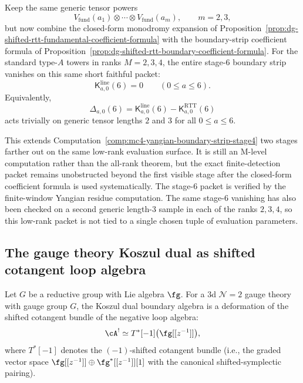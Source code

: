 \begin{computation}
\label{comp:mc4-yangian-boundary-strip-stage6}
Keep the same generic tensor powers
\[
V_{\mathrm{fund}}(a_1)\otimes\cdots\otimes V_{\mathrm{fund}}(a_m),
\qquad m=2,3,
\]
but now combine the closed-form monodromy expansion of
Proposition~\ref{prop:dg-shifted-rtt-fundamental-coefficient-formula}
with the boundary-strip coefficient formula of
Proposition~\ref{prop:dg-shifted-rtt-boundary-coefficient-formula}.
For the standard type-$A$ towers in ranks $M=2,3,4$, the entire
stage-$6$ boundary strip vanishes on this same short faithful packet:
\[
\mathsf{K}^{\mathrm{line}}_{a,0}(6)=0
\qquad (0\le a\le 6).
\]
Equivalently,
\[
\Delta_{a,0}(6)
=
\mathsf{K}^{\mathrm{line}}_{a,0}(6)
-\mathsf{K}^{\mathrm{RTT}}_{a,0}(6)
\]
acts trivially on generic tensor lengths $2$ and $3$ for all
$0\le a\le 6$.

This extends
Computation~\ref{comp:mc4-yangian-boundary-strip-stage4}
two stages farther out on the same low-rank evaluation surface. It is
still an M-level computation rather than the all-rank theorem, but the
exact finite-detection packet remains unobstructed beyond the
first visible stage after the closed-form coefficient formula is used
systematically. The stage-$6$ packet is verified by the finite-window
Yangian residue computation.
The same stage-$6$ vanishing has also been checked on a second generic
length-$3$ sample in each of the ranks $2,3,4$, so this low-rank
packet is not tied to a single chosen tuple of evaluation parameters.
\end{computation}


\subsection{The gauge theory Koszul dual as shifted cotangent loop algebra}
\label{subsec:gauge-theory-koszul-dual}

\begin{proposition}
\label{prop:gauge-theory-koszul-dual}
Let $G$ be a reductive group with Lie algebra $\fg$. For a 3d $\mathcal{N}=2$
gauge theory with gauge group $G$, the Koszul dual boundary algebra is a
deformation of the shifted cotangent bundle of the negative loop algebra:
\[
\cA^! \simeq T^*[-1]\bigl(\fg[[z^{-1}]]\bigr),
\]
where $T^*[-1]$ denotes the $(-1)$-shifted cotangent bundle
\textup{(}i.e., the graded vector space
$\fg[[z^{-1}]] \oplus \fg^*[[z^{-1}]][1]$
with the canonical shifted-symplectic pairing\textup{)}.
\end{proposition}

